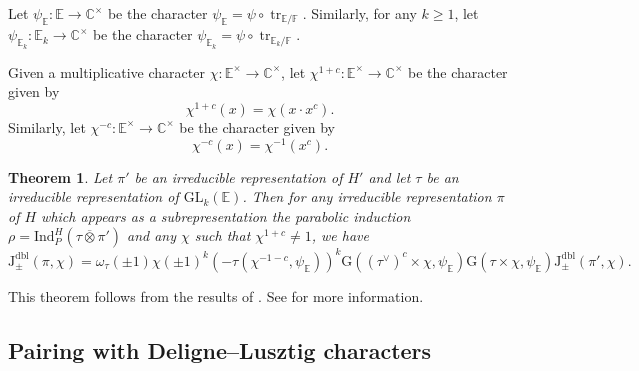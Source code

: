 \documentclass[12pt, reqno]{amsart}
\newtheorem{theorem}{Theorem}[section]
\theoremstyle{definition}
\theoremstyle{definition}
\theoremstyle{definition}
\newcommand{\cComplex}{\mathbb{C}}
\newcommand{\multiplicativegroup}[1]{#1^{\times}}
\newcommand{\fieldCharacter}{\psi}
\newcommand{\centralCharacter}[1]{\omega_{#1}}
\newcommand{\Ind}[3]{\mathrm{Ind}_{#1}^{#2}\left(#3\right)}
\newcommand{\Contragradient}[1]{#1^{\vee}}
\newcommand{\involution}[1]{#1^{c}}
\newcommand{\minusInvolution}[1]{#1^{-c}}
\newcommand{\involutionPlusOne}[1]{#1^{1+c}}
\newcommand{\minusInvolutionMinusOne}[1]{#1^{-1-c}}
\newcommand{\trace}{\operatorname{tr}}
\newcommand{\GL}{\mathrm{GL}}
\newcommand{\finiteField}{\mathbb{F}}
\newcommand{\quadraticExtension}{\mathbb{E}}
\newcommand{\quadraticFieldExtension}[1]{\quadraticExtension_{#1}}
\newcommand{\GaussSumSingleCharacter}[2]{\tau\left(#1, #2\right)}
\newcommand{\GaussSumScalar}[2]{\mathrm{G}\left(#1, #2\right)}
\newcommand{\dblJacobiSumScalar}[2]{\mathrm{J}_{\pm}^{\mathrm{dbl}}\left(#1, #2\right)}
\begin{document}
Let $\fieldCharacter_{\quadraticExtension} \colon \quadraticExtension \to \multiplicativegroup{\cComplex}$ be the character  $\fieldCharacter_{\quadraticExtension} = \fieldCharacter \circ \trace_{\quadraticExtension \slash \finiteField}$. Similarly, for any $k \ge 1$, let $\fieldCharacter_{\quadraticFieldExtension{k}} \colon \quadraticFieldExtension{k} \to \multiplicativegroup{\cComplex}$ be the character $\fieldCharacter_{\quadraticFieldExtension{k}} = \fieldCharacter \circ \trace_{\quadraticFieldExtension{k} \slash \finiteField}$.

Given a multiplicative character $\chi \colon \multiplicativegroup{\quadraticExtension} \to \multiplicativegroup{\cComplex}$, let $\involutionPlusOne{\chi} \colon \multiplicativegroup{\quadraticExtension} \to \multiplicativegroup{\cComplex}$ be the character given by
$$\involutionPlusOne{\chi}\left(x\right) = \chi\left(x \cdot \involution{x}\right).$$ Similarly, let $\minusInvolution{\chi} \colon \multiplicativegroup{\quadraticExtension} \to \multiplicativegroup{\cComplex}$ be the character given by
$$\minusInvolution{\chi}\left(x\right) = \chi^{-1}\left(\involution{x}\right).$$

\begin{theorem}\label{thm:multiplicativity-in-terms-of-gauss-sums}
	Let $\pi'$ be an irreducible representation of $H'$ and let $\tau$ be an irreducible representation of $\GL_k\left(\quadraticExtension\right)$. Then for any irreducible representation $\pi$ of $H$ which appears as a subrepresentation the parabolic induction $\rho = \Ind{P}{H}{\tau \overline{\otimes} \pi'}$ and any $\chi$ such that $\involutionPlusOne{\chi} \ne 1$, we have
	$$\dblJacobiSumScalar{\pi}{\chi} = \centralCharacter{\tau}\left(\pm 1\right) \chi\left(\pm 1\right)^k \left(-\GaussSumSingleCharacter{\minusInvolutionMinusOne{\chi}}{\fieldCharacter_{\quadraticExtension}}\right)^k \GaussSumScalar{\involution{\left(\Contragradient{\tau}\right)} \times \chi}{\fieldCharacter_{\quadraticExtension}} \GaussSumScalar{\tau \times \chi}{\fieldCharacter_{\quadraticExtension}} \dblJacobiSumScalar{\pi'}{\chi}.$$
\end{theorem}

This theorem follows from the results of \cite{GirschZelingher2025}. See  for more information.

\subsection{Pairing with Deligne--Lusztig characters}
\end{document}
